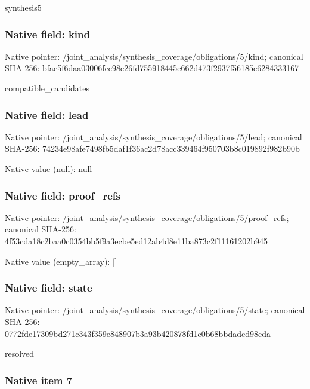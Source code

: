 \documentclass[10pt,a4paper]{article}
\begin{document}
synthesis5


\subsubsection{Native field: kind}


Native pointer: /joint\_analysis/synthesi\allowbreak{}s\_coverage/obligations/5\allowbreak{}/kind; canonical SHA-256: bfae5f6daa03006fec98e26f\allowbreak{}d755918445e662d473f2937f\allowbreak{}56185e6284333167


compatible\_candidates


\subsubsection{Native field: lead}


Native pointer: /joint\_analysis/synthesi\allowbreak{}s\_coverage/obligations/5\allowbreak{}/lead; canonical SHA-256: 74234e98afe7498fb5daf1f3\allowbreak{}6ac2d78acc339464f950703b\allowbreak{}8c019892f982b90b



Native value (null): null



\subsubsection{Native field: proof\_refs}


Native pointer: /joint\_analysis/synthesi\allowbreak{}s\_coverage/obligations/5\allowbreak{}/proof\_refs; canonical SHA-256: 4f53cda18c2baa0c0354bb5f\allowbreak{}9a3ecbe5ed12ab4d8e11ba87\allowbreak{}3c2f11161202b945



Native value (empty\_array): []



\subsubsection{Native field: state}


Native pointer: /joint\_analysis/synthesi\allowbreak{}s\_coverage/obligations/5\allowbreak{}/state; canonical SHA-256: 0772fde17309bd271c343f35\allowbreak{}9e848907b3a93b420878fd1e\allowbreak{}0b68bbdadcd98eda


resolved


\subsubsection{Native item 7}
\end{document}
